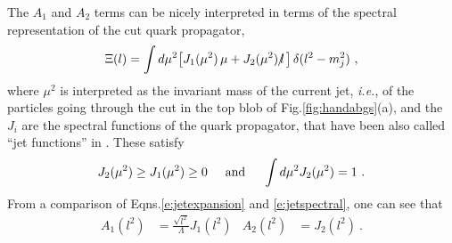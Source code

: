 \documentclass[preprintnumbers,floatfix,nofootinbib]{revtex4}
\newcommand{\lslash}{l \hspace{-0.19cm} / \,}
\begin{document}
The $A_1$ and $A_2$ terms can be nicely interpreted in terms of the spectral representation of the cut quark propagator,
\begin{align} 
  \Xi(l) =  
  \int d \mu^2 \big[ J_1 (\mu^2)\,\mu + J_2 (\mu^2)\,\lslash \big] \,
  \delta(l^2 -m_j^2) \ ,
\label{e:jetspectral}
\end{align}
where $\mu^2$ is interpreted as the invariant mass of the current jet, {\it i.e.}, of the particles going through the cut in the top blob of Fig.\ref{fig:handabgs}(a), and the $J_i$ are the spectral functions of the quark propagator, that have been also called ``jet functions'' in \cite{Accardi-Qiu}. These satisfy \cite{D'Hoker-lecture-notes,Romao-lecture-notes}
\begin{align}
  J_2(\mu^2) \geq J_1(\mu^2) \geq 0
  \hspace*{0.5cm} \text{and} \hspace*{0.5cm}
  \int d\mu^2 J_2(\mu^2) = 1 \ .
\label{eq:jetfnsprops}
\end{align}
From a comparison of Eqns.\eqref{e:jetexpansion} and \eqref{e:jetspectral}, one can see that 
\begin{align}
  A_1(l^2)&=\frac{\sqrt{l^2}}{\Lambda}J_1(l^2) & A_2(l^2)&=J_2(l^2) \ .
  \label{eq:jet_vs_spectral}
\end{align}
\end{document}
